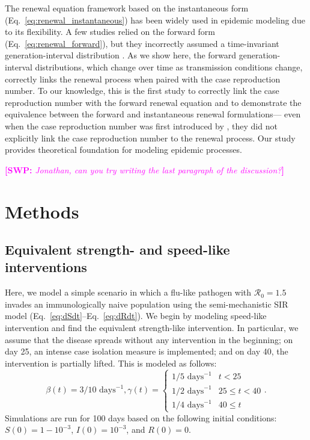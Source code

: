 \documentclass[12pt]{article}
\newcommand{\comment}{\showcomment}
\newcommand{\showcomment}[3]{\textcolor{#1}{\textbf{[#2: }\textsl{#3}\textbf{]}}}
\newcommand{\swp}[1]{\comment{magenta}{SWP}{#1}}
\newcommand{\eref}[1]{Eq.~\ref{eq:#1}}
\newcommand{\Rx}[1]{\ensuremath{{\mathcal R}_{#1}}\xspace}
\newcommand{\Ro}{\Rx{0}}
\begin{document}
The renewal equation framework based on the instantaneous form (\eref{renewal_instantaneous}) has been widely used in epidemic modeling due to its flexibility.
A few studies relied on the forward form (\eref{renewal_forward}), but they incorrectly assumed a time-invariant generation-interval distribution \citep{nishiura2007time,alvarez2020variational,white2021statistical}.
As we show here, the forward generation-interval distributions, which change over time as transmission conditions change, correctly links the renewal process when paired with the case reproduction number.
To our knowledge, this is the first study to correctly link the case reproduction number with the forward renewal equation and to demonstrate the equivalence between the forward and instantaneous renewal formulations---
even when the case reproduction number was first introduced by \cite{wallinga2004different}, they did not explicitly link the case reproduction number to the renewal process.
Our study provides theoretical foundation for modeling epidemic processes.

\swp{Jonathan, can you try writing the last paragraph of the discussion?}


\section{Methods}

\subsection{Equivalent strength- and speed-like interventions}

Here, we model a simple scenario in which a flu-like pathogen with $\Ro = 1.5$ invades an immunologically naive population using the semi-mechanistic SIR model (\eref{dSdt}--\eref{dRdt}).
We begin by modeling speed-like intervention and find the equivalent strength-like intervention.  
In particular, we assume that the disease spreads without any intervention in the beginning;
on day 25, an intense case isolation measure is implemented; and
on day 40, the intervention is partially lifted.
This is modeled as follows:
\begin{equation}
\beta(t) = 3/10\,\,\textrm{days}^{-1}, \gamma(t) = \begin{cases}
1/5\,\, \textrm{days}^{-1} & t < 25\\
1/2\,\, \textrm{days}^{-1} & 25 \leq t < 40 \\
1/4\,\, \textrm{days}^{-1} & 40 \leq t
\end{cases}.
\end{equation}
Simulations are run for 100 days based on the following initial conditions: $S(0) = 1 - 10^{-3}$, $I(0) = 10^{-3}$, and $R(0) = 0$.
\end{document}
